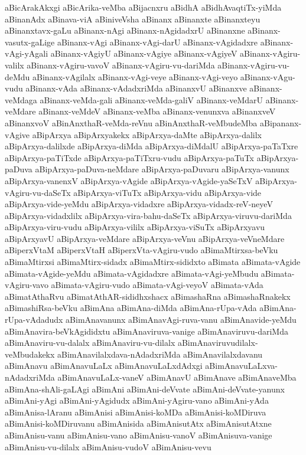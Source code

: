 {aBicArakAkxgi
aBicArika-veMba
aBijacnxru
aBidhA
aBidhAvaqtiTx-yiMda
aBinanAdx
aBinava-viA
aBiniveVsha
aBinanx
aBinanxte
aBinanxteyu
aBinanxtavx-gaLu
aBinanx-nAgi
aBinanx-nAgidadxrU
aBinanxne
aBinanx-vasutx-gaLige
aBinanx-vAgi
aBinanx-vAgi-darU
aBinanx-vAgidadxre
aBinanx-vAgi-yAgali
aBinanx-vAgiyU
aBinanx-vAgiye
aBinanx-vAgiyeV
aBinanx-vAgiru-valilx
aBinanx-vAgiru-vavoV
aBinanx-vAgiru-vu-dariMda
aBinanx-vAgiru-vu-deMdu
aBinanx-vAgilalx
aBinanx-vAgi-veye
aBinanx-vAgi-veyo
aBinanx-vAgu-vudu
aBinanx-vAda
aBinanx-vAdadxriMda
aBinanxvU
aBinanxve
aBinanx-veMdaga
aBinanx-veMda-gali
aBinanx-veMda-galiV
aBinanx-veMdarU
aBinanx-veMdare
aBinanx-veMdeV
aBinanx-veMba
aBinanx-venunxva
aBinanxveV
aBinanxvoV
aBinAnxthaR-veMda-reVnu
aBinAnxthaR-veMbudeMba
aBipananx-vAgive
aBipArxya
aBipArxyakekx
aBipArxya-daMte
aBipArxya-dalilx
aBipArxya-dalilxde
aBipArxya-diMda
aBipArxya-diMdalU
aBipArxya-paTaTxre
aBipArxya-paTiTxde
aBipArxya-paTiTxru-vudu
aBipArxya-paTuTx
aBipArxya-paDuva
aBipArxya-paDuva-neMdare
aBipArxya-paDuvaru
aBipArxya-vanunx
aBipArxya-vanenxV
aBipArxya-vAgide
aBipArxya-vAgide-yaSeTxV
aBipArxya-vAgiru-vu-daSeTx
aBipArxya-viTuTx
aBipArxya-vidu
aBipArxya-vide
aBipArxya-vide-yeMdu
aBipArxya-vidadxre
aBipArxya-vidadx-reV-neyeV
aBipArxya-vidadxlilx
aBipArxya-vira-bahu-daSeTx
aBipArxya-viruvu-dariMda
aBipArxya-viru-vudu
aBipArxya-vililx
aBipArxya-viSuTx
aBipArxyavu
aBipArxyavU
aBipArxya-veMdare
aBipArxya-veVnu
aBipArxya-veVneMdare
aBiperxVtaM
aBiperxVtaH
aBiperxVta-vAgiru-vudo
aBimaMtirxsa-beVku
aBimaMtirxsi
aBimaMtirx-sidadx
aBimaMtirx-sididxto
aBimata
aBimata-vAgide
aBimata-vAgide-yeMdu
aBimata-vAgidadxre
aBimata-vAgi-yeMbudu
aBimata-vAgiru-vavo
aBimata-vAgiru-vudo
aBimata-vAgi-veyoV
aBimata-vAda
aBimatAthaRvu
aBimatAthAR-sididhxshacx
aBimashaRna
aBimashaRnakekx
aBimashiRsa-beVku
aBimAna
aBimAna-diMda
aBimAna-rUpa-vAda
aBimAna-rUpa-vAdadudx
aBimAnavanunx
aBimAnavAgi-ruva-vanu
aBimAnavide-yeMdu
aBimAnavira-beVkAgididxtu
aBimAnaviruva-vanige
aBimAnaviruvu-dariMda
aBimAnaviru-vu-dalalx
aBimAnaviru-vu-dilalx
aBimAnaviruvudilalx-veMbudakekx
aBimAnavilalxdava-nAdadxriMda
aBimAnavilalxdavanu
aBimAnavu
aBimAnavuLaLx
aBimAnavuLaLxdAdxgi
aBimAnavuLaLxva-nAdadxriMda
aBimAnavuLaLx-vaneV
aBimAnavU
aBimAnave
aBimAnaveMba
aBimAna-shAli-gaLAgi
aBimAni
aBimAni-deVvate
aBimAni-deVvate-yanunx
aBimAni-yAgi
aBimAni-yAgidudx
aBimAni-yAgiru-vano
aBimAni-yAda
aBimAnisa-lAranu
aBimAnisi
aBimAnisi-koMDa
aBimAnisi-koMDiruva
aBimAnisi-koMDiruvanu
aBimAnisida
aBimAnisutAtx
aBimAnisutAtxne
aBimAnisu-vanu
aBimAnisu-vano
aBimAnisu-vanoV
aBimAnisuva-vanige
aBimAnisu-vu-dilalx
aBimAnisu-vudoV
aBimAnisu-vevu
}
